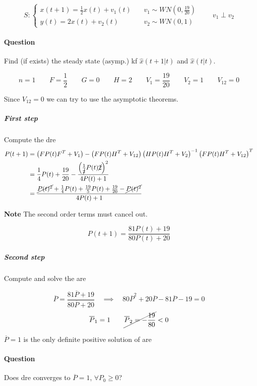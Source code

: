 


\begin{exa}
    \[
        S: \begin{cases}
            x(t+1) = \frac{1}{2}x(t) + v_1(t) \quad& v_1 \sim WN(0, \frac{19}{20}) \\
            y(t) = 2x(t) + v_2(t) \quad& v_2 \sim WN(0, 1)
        \end{cases}
        \qquad
        v_1 \perp v_2
    \]

    \paragraph{Question} Find (if exists) the steady state (asymp.) \gls{kf} $\hat{x}(t+1|t)$ and $\hat{x}(t|t)$.

    \[
        n = 1 \qquad F = \frac{1}{2} \qquad G = 0 \qquad H = 2 \qquad V_1 = \frac{19}{20} \qquad V_2 = 1 \qquad V_{12} = 0
    \]

    Since $V_{12} = 0$ we can try to use the asymptotic theorems.

    \subparagraph{First step} Compute the \gls{dre}
    \begin{align*}
        P(t+1) &= \left( FP(t)F^T+V_1 \right) - \left( FP(t)H^T+V_{12} \right) \left( HP(t)H^T+V_2 \right)^{-1}\left( FP(t)H^T+V_{12} \right)^T \\
        &= \frac{1}{4}P(t) + \frac{19}{20} - \frac{ \left(\frac{1}{\cancel{2}}P(t)\cancel{2}\right)^2 }{4P(t)+1} \\
        &= \frac{\cancel{P(t)^2} + \frac{1}{4}P(t) + \frac{19}{5} P(t) + \frac{19}{20} - \cancel{P(t)^2} }{4P(t) + 1}
    \end{align*}

    \textbf{Note} The second order terms must cancel out.

    \[
        P(t+1) = \frac{81P(t) + 19}{80P(t)+20}
    \]

    \subparagraph{Second step} Compute and solve the \gls{are}

    \[
        \overline{P} = \frac{81\overline{P} + 19}{80\overline{P}+20} \quad \implies \quad 80\overline{P}^2 + 20\overline{P}-81\overline{P}-19 = 0
    \]
    \[
        \overline{P}_1 = 1 \qquad \cancel{\overline{P}_2 = -\frac{19}{80}} < 0
    \]


    $\overline{P}=1$ is the only definite positive solution of \gls{are}

    \paragraph{Question} Does \gls{dre} converges to $\overline{P}=1$, $\forall P_0 \ge 0$?


\end{exa}
